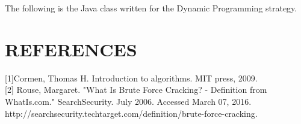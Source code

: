 \documentclass[12pt]{article}
\begin{document}
	The following is the Java class written for the Dynamic Programming strategy.  \\
	
	\hrulefill 
 	


 \pagebreak
	\section*{REFERENCES}
	
	[1]Cormen, Thomas H. Introduction to algorithms. MIT press, 2009.\\
	
	[2]	Rouse, Margaret. "What Is Brute Force Cracking? - Definition from WhatIs.com." SearchSecurity. July 2006. Accessed March 07, 2016. http://searchsecurity.techtarget.com/definition/brute-force-cracking.\\
	
	
	
\end{document}
